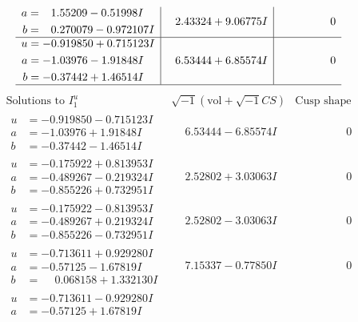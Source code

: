\documentclass[1p]{elsarticle_modified}
\theoremstyle{definition}
\newcommand{\I}{\sqrt{-1}}
\begin{document}
$$\begin{array}{c|c|c}
\begin{aligned}
a &= \phantom{-}1.55209 - 0.51998 I \\
b &= \phantom{-}0.270079 - 0.972107 I\end{aligned}
 & \phantom{-}2.43324 + 9.06775 I & \phantom{-0.000000 } 0 \\ \hline\begin{aligned}
u &= -0.919850 + 0.715123 I \\
a &= -1.03976 - 1.91848 I \\
b &= -0.37442 + 1.46514 I\end{aligned}
 & \phantom{-}6.53444 + 6.85574 I & \phantom{-0.000000 } 0\\
 \hline 
 \end{array}$$\newpage$$\begin{array}{c|c|c}  
\text{Solutions to }I^u_{1}& \I (\text{vol} + \sqrt{-1}CS) & \text{Cusp shape}\\
 \hline 
\begin{aligned}
u &= -0.919850 - 0.715123 I \\
a &= -1.03976 + 1.91848 I \\
b &= -0.37442 - 1.46514 I\end{aligned}
 & \phantom{-}6.53444 - 6.85574 I & \phantom{-0.000000 } 0 \\ \hline\begin{aligned}
u &= -0.175922 + 0.813953 I \\
a &= -0.489267 - 0.219324 I \\
b &= -0.855226 + 0.732951 I\end{aligned}
 & \phantom{-}2.52802 + 3.03063 I & \phantom{-0.000000 } 0 \\ \hline\begin{aligned}
u &= -0.175922 - 0.813953 I \\
a &= -0.489267 + 0.219324 I \\
b &= -0.855226 - 0.732951 I\end{aligned}
 & \phantom{-}2.52802 - 3.03063 I & \phantom{-0.000000 } 0 \\ \hline\begin{aligned}
u &= -0.713611 + 0.929280 I \\
a &= -0.57125 - 1.67819 I \\
b &= \phantom{-}0.068158 + 1.332130 I\end{aligned}
 & \phantom{-}7.15337 - 0.77850 I & \phantom{-0.000000 } 0 \\ \hline\begin{aligned}
u &= -0.713611 - 0.929280 I \\
a &= -0.57125 + 1.67819 I \\

\end{aligned}
\end{array}$$
\end{document}
